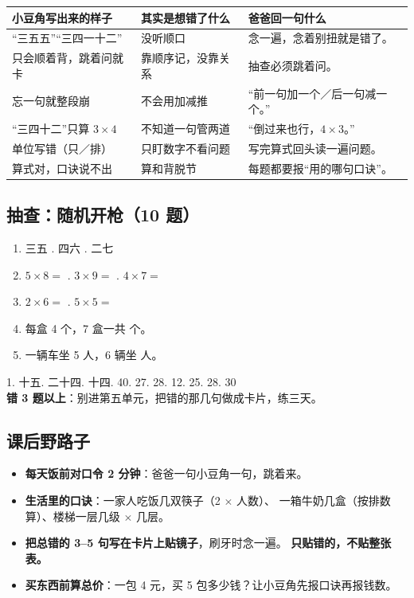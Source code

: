 \begin{center}
\small
\begin{tabularx}{\linewidth}{@{}p{3.8cm}p{4.0cm}X@{}}
\toprule
\textbf{小豆角写出来的样子} & \textbf{其实是想错了什么} & \textbf{爸爸回一句什么} \\
\midrule
“三五五”“三四一十二” & 没听顺口 & 念一遍，念着别扭就是错了。 \\
\addlinespace[2pt]
只会顺着背，跳着问就卡 & 靠顺序记，没靠关系 & 抽查必须跳着问。 \\
\addlinespace[2pt]
忘一句就整段崩 & 不会用加减推 & “前一句加一个／后一句减一个。” \\
\addlinespace[2pt]
“三四十二”只算 $3\times4$ & 不知道一句管两道 & “倒过来也行，$4\times3$。” \\
\addlinespace[2pt]
单位写错（只／排） & 只盯数字不看问题 & 写完算式回头读一遍问题。 \\
\addlinespace[2pt]
算式对，口诀说不出 & 算和背脱节 & 每题都要报“用的哪句口诀”。 \\
\bottomrule
\end{tabularx}
\end{center}

\subsection{抽查：随机开枪（10 题）}

\begin{enumerate}[label=\arabic*.,itemsep=4pt]
  \item 三五 \blank[1.6cm] . 四六 \blank[1.6cm] . 二七 \blank[1.6cm]
  \item $5\times8=$ \blank[1.4cm] . $3\times9=$ \blank[1.4cm] . $4\times7=$ \blank[1.4cm]
  \item $2\times6=$ \blank[1.4cm] . $5\times5=$ \blank[1.4cm]
  \item 每盒 4 个，7 盒一共 \blank[1.4cm] 个。
  \item 一辆车坐 5 人，6 辆坐 \blank[1.4cm] 人。
\end{enumerate}

\begin{ansbox}
1. 十五. 二十四. 十四. 40. 27. 28. 12. 25. 28. 30 \\
\textbf{错 3 题以上}：别进第五单元，把错的那几句做成卡片，练三天。
\end{ansbox}

\subsection{课后野路子}

\begin{itemize}
  \item \textbf{每天饭前对口令 2 分钟}：爸爸一句小豆角一句，跳着来。
  \item \textbf{生活里的口诀}：一家人吃饭几双筷子（2 $\times$ 人数）、
        一箱牛奶几盒（按排数算）、楼梯一层几级 $\times$ 几层。
  \item \textbf{把总错的 3--5 句写在卡片上贴镜子}，刷牙时念一遍。
        \textbf{只贴错的，不贴整张表。}
  \item \textbf{买东西前算总价}：一包 4 元，买 5 包多少钱？让小豆角先报口诀再报钱数。
\end{itemize}
